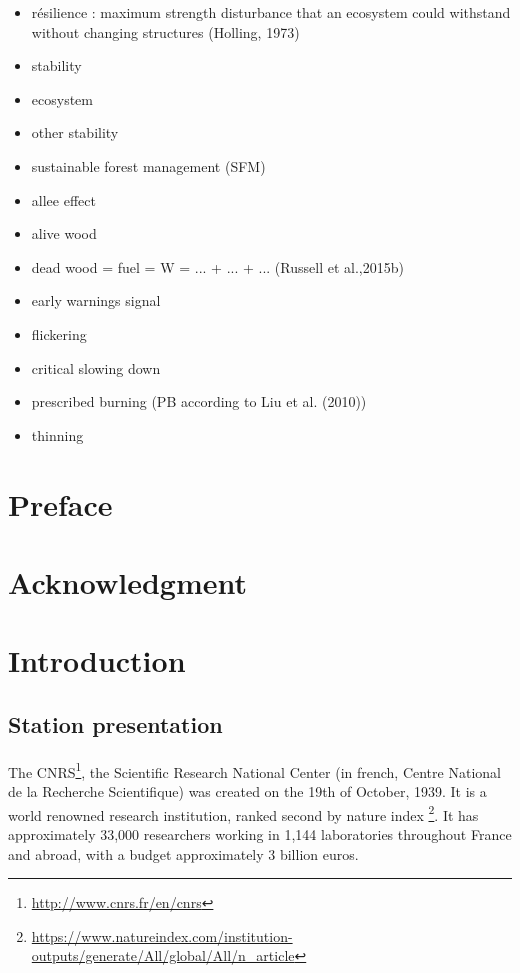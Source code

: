 \documentclass{article}
\begin{document}
\begin{itemize}
    \item résilience : maximum strength disturbance that an ecosystem
could withstand without changing structures (Holling, 1973)
    \item stability
    \item ecosystem
    \item other stability
    \item sustainable forest management (SFM)
    \item allee effect
    \item alive wood
    \item dead wood = fuel  = W = ... + ... + ... (Russell et al.,2015b)
    \item early warnings signal
    \item flickering
    \item critical slowing down
    \item prescribed burning (PB according to Liu et al. (2010))
    \item thinning
\end{itemize}



\newpage
{}
\section*{Preface}


\newpage
\section*{Acknowledgment}



\newpage
\section*{Introduction}

\subsection*{Station presentation}

\paragraph{}
The CNRS\footnote{\url{http://www.cnrs.fr/en/cnrs}}, the Scientific Research National Center (in french, Centre National de la Recherche Scientifique) was created on the 19th of October, 1939. It is a world renowned research institution, ranked second by nature index \footnote{\url{https://www.natureindex.com/institution-outputs/generate/All/global/All/n_article}}. It has approximately 33,000 researchers working in 1,144 laboratories throughout France and abroad, with a budget approximately 3 billion euros. 
\end{document}
